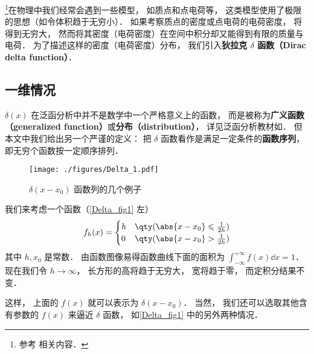 
\begin{issues}
\issueTODO
\end{issues}

\footnote{参考 \cite{Arfken} 相关内容．}在物理中我们经常会遇到一些模型， 如质点和点电荷等， 这类模型使用了极限的思想（如令体积趋于无穷小）． 如果考察质点的密度或点电荷的电荷密度， 将得到无穷大， 然而将其密度（电荷密度）在空间中积分却又能得到有限的质量与电荷． 为了描述这样的密度（电荷密度）分布， 我们引入\textbf{狄拉克 $\delta$ 函数（Dirac delta function）}．

\subsection{一维情况}

$\delta(x)$ 在泛函分析中并不是数学中一个严格意义上的函数， 而是被称为\textbf{广义函数（generalized function）}或\textbf{分布（distribution）}， 详见泛函分析教材如\cite{Zeidler}． 但本文中我们给出另一个严谨的定义： 把 $\delta$ 函数看作是满足一定条件的\textbf{函数序列}， 即无穷个函数按一定顺序排列．

\begin{figure}[ht]
\centering
\texttt{[image: ./figures/Delta\_1.pdf]}
\caption{$\delta(x - x_0)$ 函数列的几个例子} \label{Delta_fig1}
\end{figure}

我们来考虑一个函数（\autoref{Delta_fig1} 左）
\begin{equation}\label{Delta_eq6}
f_h(x) =
\begin{cases}
h & \qty( \abs{x - x_0} \leqslant \frac{1}{2h} )\\
0 & \qty( \abs{x - x_0} > \frac{1}{2h} )
\end{cases}
\end{equation}
其中 $h, x_0$ 是常数． 由函数图像易得函数曲线下面的面积为 $\int_{-\infty}^{+\infty} f(x) \dd{x} = 1$． 现在我们令 $h \to \infty$， 长方形的高将趋于无穷大， 宽将趋于零， 而定积分结果不变．

这样， 上面的 $f(x)$ 就可以表示为 $\delta(x - x_0)$． 当然， 我们还可以选取其他含有参数的 $f(x)$ 来逼近 $\delta$ 函数， 如\autoref{Delta_fig1} 中的另外两种情况．

